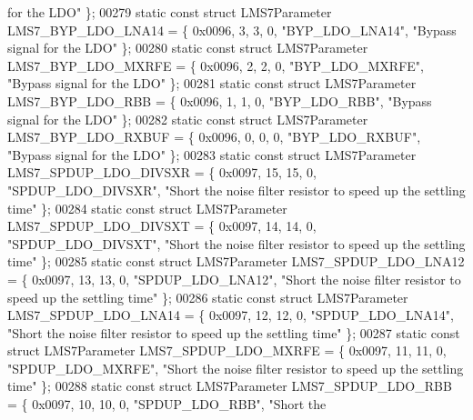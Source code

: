 \begin{DoxyCode}
{       for the LDO"} \};
00279 \textcolor{keyword}{static} \textcolor{keyword}{const} \textcolor{keyword}{struct }LMS7Parameter LMS7_BYP_LDO_LNA14 = \{ 0x0096, 3, 3, 0, \textcolor{stringliteral}{"BYP\_LDO\_LNA14"}, \textcolor{stringliteral}{"Bypass signal
       for the LDO"} \};
00280 \textcolor{keyword}{static} \textcolor{keyword}{const} \textcolor{keyword}{struct }LMS7Parameter LMS7_BYP_LDO_MXRFE = \{ 0x0096, 2, 2, 0, \textcolor{stringliteral}{"BYP\_LDO\_MXRFE"}, \textcolor{stringliteral}{"Bypass signal
       for the LDO"} \};
00281 \textcolor{keyword}{static} \textcolor{keyword}{const} \textcolor{keyword}{struct }LMS7Parameter LMS7_BYP_LDO_RBB = \{ 0x0096, 1, 1, 0, \textcolor{stringliteral}{"BYP\_LDO\_RBB"}, \textcolor{stringliteral}{"Bypass signal for
       the LDO"} \};
00282 \textcolor{keyword}{static} \textcolor{keyword}{const} \textcolor{keyword}{struct }LMS7Parameter LMS7_BYP_LDO_RXBUF = \{ 0x0096, 0, 0, 0, \textcolor{stringliteral}{"BYP\_LDO\_RXBUF"}, \textcolor{stringliteral}{"Bypass signal
       for the LDO"} \};
00283 \textcolor{keyword}{static} \textcolor{keyword}{const} \textcolor{keyword}{struct }LMS7Parameter LMS7_SPDUP_LDO_DIVSXR = \{ 0x0097, 15, 15, 0, \textcolor{stringliteral}{"SPDUP\_LDO\_DIVSXR"}, \textcolor{stringliteral}{"Short
       the noise filter resistor to speed up the settling time"} \};
00284 \textcolor{keyword}{static} \textcolor{keyword}{const} \textcolor{keyword}{struct }LMS7Parameter LMS7_SPDUP_LDO_DIVSXT = \{ 0x0097, 14, 14, 0, \textcolor{stringliteral}{"SPDUP\_LDO\_DIVSXT"}, \textcolor{stringliteral}{"Short
       the noise filter resistor to speed up the settling time"} \};
00285 \textcolor{keyword}{static} \textcolor{keyword}{const} \textcolor{keyword}{struct }LMS7Parameter LMS7_SPDUP_LDO_LNA12 = \{ 0x0097, 13, 13, 0, \textcolor{stringliteral}{"SPDUP\_LDO\_LNA12"}, \textcolor{stringliteral}{"Short the
       noise filter resistor to speed up the settling time"} \};
00286 \textcolor{keyword}{static} \textcolor{keyword}{const} \textcolor{keyword}{struct }LMS7Parameter LMS7_SPDUP_LDO_LNA14 = \{ 0x0097, 12, 12, 0, \textcolor{stringliteral}{"SPDUP\_LDO\_LNA14"}, \textcolor{stringliteral}{"Short the
       noise filter resistor to speed up the settling time"} \};
00287 \textcolor{keyword}{static} \textcolor{keyword}{const} \textcolor{keyword}{struct }LMS7Parameter LMS7_SPDUP_LDO_MXRFE = \{ 0x0097, 11, 11, 0, \textcolor{stringliteral}{"SPDUP\_LDO\_MXRFE"}, \textcolor{stringliteral}{"Short the
       noise filter resistor to speed up the settling time"} \};
00288 \textcolor{keyword}{static} \textcolor{keyword}{const} \textcolor{keyword}{struct }LMS7Parameter LMS7_SPDUP_LDO_RBB = \{ 0x0097, 10, 10, 0, \textcolor{stringliteral}{"SPDUP\_LDO\_RBB"}, \textcolor{stringliteral}{"Short the
}
\end{DoxyCode}
